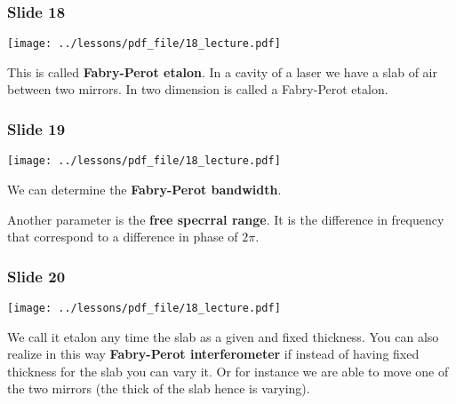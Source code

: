 \documentclass[../main/main.tex]{subfiles}
\begin{document}
\subsubsection*{Slide 18}

\begin{minipage}[]{0.5\linewidth}
\centering
\texttt{[image: ../lessons/pdf\_file/18\_lecture.pdf]}
\end{minipage}
\hspace{0.3cm}\vspace{0.3cm}
\begin{minipage}[c]{0.47\linewidth}

This is called \textbf{Fabry-Perot etalon}. In a cavity of a laser we have a slab of air between two mirrors. In two dimension is called a Fabry-Perot etalon.

\end{minipage}

\subsubsection*{Slide 19}

\begin{minipage}[]{0.5\linewidth}
\centering
\texttt{[image: ../lessons/pdf\_file/18\_lecture.pdf]}
\end{minipage}
\hspace{0.3cm}\vspace{0.3cm}
\begin{minipage}[c]{0.47\linewidth}

We can determine the \textbf{Fabry-Perot bandwidth}.

Another parameter is the \textbf{free specrral range}. It is the difference in frequency that correspond to a difference in phase of \( 2 \pi  \).

\end{minipage}

\subsubsection*{Slide 20}

\begin{minipage}[]{0.5\linewidth}
\centering
\texttt{[image: ../lessons/pdf\_file/18\_lecture.pdf]}
\end{minipage}
\hspace{0.3cm}\vspace{0.3cm}
\begin{minipage}[c]{0.47\linewidth}

We call it etalon any time the slab as a given and fixed thickness. You can also realize in this way \textbf{Fabry-Perot interferometer} if instead of having fixed thickness for the slab you can vary it. Or for instance we are able to move one of the two mirrors (the thick of the slab hence is varying).

\end{minipage}
\end{document}
